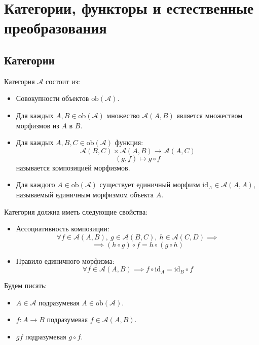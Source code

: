 \documentclass[document]{subfiles}
\begin{document}
\chapter{Категории, функторы и естественные преобразования}
\section{Категории}
\begin{definition}
    Категория $\mathcal{A}$ состоит из:

    \begin{itemize}
        \item Совокупности объектов $\text{ob}(\mathcal{A})$.
        \item Для каждых $A, B \in \text{ob}(\mathcal{A})$ множество $\mathcal{A}(A,B)$ является множеством морфизмов из $A$ в $B$.
        \item Для каждых $A, B, C \in \text{ob}(\mathcal{A})$ функция:
        \[\mathcal{A}(B,C) \times \mathcal{A}(A,B) \to \mathcal{A}(A,C)\]
        \[(g,f) \mapsto g \circ f\]
        называется композицией морфизмов.
        \item Для каждого $A \in \text{ob}(\mathcal{A})$ существует единичный морфизм $\text{id}_A \in \mathcal{A}(A,A)$, называемый единичным морфизмом объекта $A$.
    \end{itemize}
    Категория должна иметь следующие свойства:
    \begin{itemize}
        \item Ассоциативность композиции:
            \[\forall f \in \mathcal{A}(A,B), ~g \in \mathcal{A}(B,C), ~ h \in \mathcal{A}(C,D) \implies\]
            \[\implies (h \circ g)\circ f = h \circ (g \circ h)\]
        \item Правило единичного морфизма:
        \[\forall f \in \mathcal{A}(A,B) \implies f \circ \text{id}_A = \text{id}_B \circ f\]
    \end{itemize}
\end{definition}

\begin{remark}
    Будем писать:
    \begin{itemize}
        \item $A \in \mathcal{A}$ подразумевая $A \in \text{ob}(\mathcal{A})$.
        \item $f: A \to B$ подразумевая $f \in \mathcal{A}(A,B)$.
        \item $gf$ подразумевая $g \circ f$.
    \end{itemize}
\end{remark}
\end{document}
